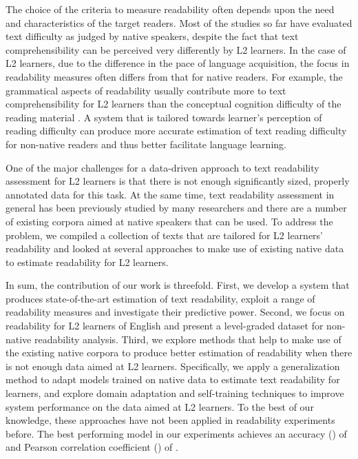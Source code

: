 \documentclass[11pt,letterpaper]{article}
\begin{document}
The choice of the criteria to measure readability often depends upon the need and characteristics of the target readers. Most of the studies so far have evaluated text difficulty as judged by native speakers, despite the fact that text comprehensibility can be perceived very differently by L2 learners. In the case of L2 learners, due to the difference in the pace of language acquisition, the focus in readability measures often differs from that for native readers. For example, the grammatical aspects of readability usually contribute more to text comprehensibility for L2 learners than the conceptual cognition difficulty of the reading material \cite{callan2007combining}. A system that is tailored towards learner's perception of reading difficulty can produce more accurate estimation of text reading difficulty for non-native readers and thus better facilitate language learning. 

One of the major challenges for a data-driven approach to text readability assessment for L2 learners is that there is not enough significantly sized, properly annotated data for this task. At the same time, text readability assessment in general has been previously studied by many researchers and there are a number of existing corpora aimed at native speakers that can be used. To address the problem, we compiled a collection of texts that are tailored for L2 learners' readability and looked at several approaches to make use of existing native data to estimate readability for L2 learners. 

In sum, the contribution of our work is threefold. First, we develop a system that produces state-of-the-art estimation of text readability, exploit a range of readability measures and investigate their predictive power. Second, we focus on readability for L2 learners of English and present a level-graded dataset for non-native readability analysis. Third, we explore methods that help to make use of the existing native corpora to produce better estimation of readability when there is not enough data aimed at L2 learners. Specifically, we apply a generalization method to adapt models trained on native data to estimate text readability for learners, and explore domain adaptation and self-training techniques to improve system performance on the data aimed at L2 learners. To the best of our knowledge, these approaches have not been applied in readability experiments before. The best performing model in our experiments achieves an accuracy () of  and Pearson correlation coefficient () of .
\end{document}
